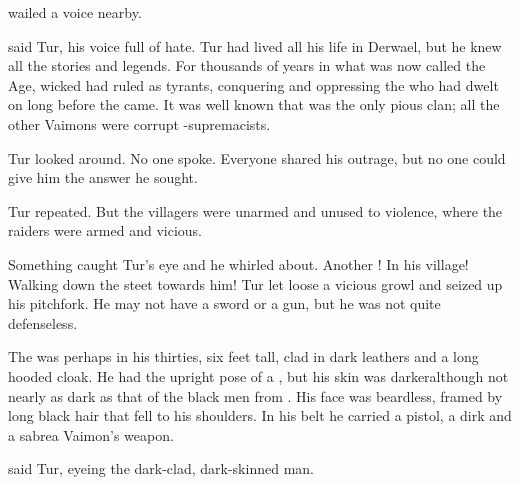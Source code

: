  wailed a voice nearby.

 said Tur, his voice full of hate. 
Tur had lived all his life in Derwael, but he knew all the stories and legends. 
For thousands of years in what was now called the \Human Age, wicked \VaimonClans had ruled as tyrants, conquering and oppressing the \scathae who had dwelt on \Miith long before the \humans came.
It was well known that \ClanZether was the only pious clan; all the other Vaimons were corrupt \human-supremacists. 


Tur looked around. 
No one spoke. 
Everyone shared his outrage, but no one could give him the answer he sought. 

 Tur repeated.
But the villagers were unarmed and unused to violence, where the raiders were armed and vicious. 

Something caught Tur's eye and he whirled about. 
Another \human! 
In his village! 
Walking down the steet towards him! 
Tur let loose a vicious growl and seized up his pitchfork. 
He may not have a sword or a gun, but he was not quite defenseless. 

The \human was perhaps in his thirties, six feet tall, clad in dark leathers and a long hooded cloak.
He had the upright pose of a , but his skin was darker\dash although not nearly as dark as that of the black men from \Durcac. 
His face was beardless, framed by long black hair that fell to his shoulders. 
In his belt he carried a pistol, a dirk and a sabre\dash a Vaimon's weapon. 

 said Tur, eyeing the dark-clad, dark-skinned man. 

